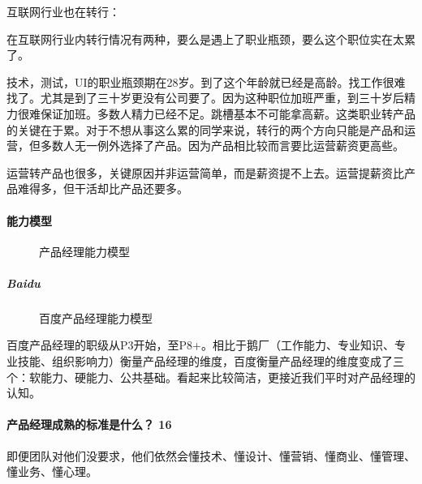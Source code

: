 \documentclass[letterpaper,10pt,english]{sphinxmanual}
\begin{document}
互联网行业也在转行：

在互联网行业内转行情况有两种，要么是遇上了职业瓶颈，要么这个职位实在太累了。

技术，测试，UI的职业瓶颈期在28岁。到了这个年龄就已经是高龄。找工作很难找了。尤其是到了三十岁更没有公司要了。因为这种职位加班严重，到三十岁后精力很难保证加班。多数人精力已经不足。跳槽基本不可能拿高薪。这类职业转产品的关键在于累。对于不想从事这么累的同学来说，转行的两个方向只能是产品和运营，但多数人无一例外选择了产品。因为产品相比较而言要比运营薪资更高些。

运营转产品也很多，关键原因并非运营简单，而是薪资提不上去。运营提薪资比产品难得多，但干活却比产品还要多。


\paragraph{能力模型}
\label{\detokenize{chapter_introduction/PM:id62}}
\begin{figure}[H]
\centering
\capstart

\noindent{}
\caption{产品经理能力模型}\label{\detokenize{chapter_introduction/PM:id75}}\end{figure}


\subparagraph{Baidu}
\label{\detokenize{chapter_introduction/PM:baidu}}
\begin{figure}[H]
\centering
\capstart

\noindent{}
\caption{百度\sphinxhyphen{}产品经理能力模型\sphinxfootnotemark[211]}\label{\detokenize{chapter_introduction/PM:id76}}\end{figure}
%
\begin{footnotetext}[211]\sphinxAtStartFootnote
{}
%
\end{footnotetext}\ignorespaces 
百度产品经理的职级从P3开始，至P8+。相比于鹅厂（工作能力、专业知识、专业技能、组织影响力）衡量产品经理的维度，百度衡量产品经理的维度变成了三个：软能力、硬能力、公共基础。看起来比较简洁，更接近我们平时对产品经理的认知。


\paragraph{产品经理成熟的标准是什么？ 16\sphinxfootnotemark[212]}
\label{\detokenize{chapter_introduction/PM:id63}}%
\begin{footnotetext}[212]\sphinxAtStartFootnote
{}
%
\end{footnotetext}\ignorespaces 
即便团队对他们没要求，他们依然会懂技术、懂设计、懂营销、懂商业、懂管理、懂业务、懂心理。
\end{document}
